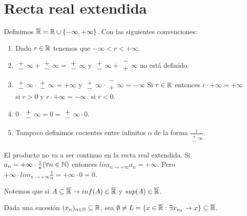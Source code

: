 \section{Recta real extendida}

\begin{definition}
    Definimos $\overline{\mathbb{R}} = \mathbb{R} \cup \{ -\infty, +\infty \}$. Con las siguientes convenciones:
    \begin{enumerate}
        \item Dado $r \in \mathbb{R}$ tenemos que $-\infty < r < +\infty$.
        \item $\substack{+ \\ -} \infty + \substack{+ \\ -} \infty = \substack{+ \\ -} \infty$ y
        $\substack{+ \\ -} \infty + \substack{- \\ +} \infty$ no está definido. 
        \item $\substack{+ \\ -} \infty \cdot \substack{+ \\ -} \infty = +\infty$ y
        $\substack{+ \\ -} \infty \cdot \substack{- \\ +} \infty = -\infty$
        Si $r \in \mathbb{R}$ entonces $r \cdot +\infty = +\infty$ si $r > 0$ y $r \cdot +\infty = -\infty$. si $r < 0$.
        \item $0 \cdot \substack{+ \\ -} \infty = 0 = \substack{+ \\ -} \infty \cdot 0$.
        \item Tampoco definimos cocientes entre infinitos o de la forma $\frac{r}{\substack{+ \\ -} \infty}$.
    \end{enumerate}
\end{definition}

\begin{note}
    El producto no va a ser continuo en la recta real extendida.
    Si $a_n = +\infty \cdot \frac{1}{n} (\forall n \in \mathbb{N})$ entonces $lim_{n \to +\infty} a_n = +\infty$. Pero $+\infty \cdot lim_{n \to +\infty} \frac{1}{n} = +\infty \cdot 0 = 0$. 
\end{note}

Notemos que si $A \subseteq \overline{\mathbb{R}} \to inf(A) \in \overline{\mathbb{R}}$ y $sup(A) \in \overline{\mathbb{R}}$.

Dada una sucesión $(x_n)_{n \in \mathbb{N}} \subseteq \mathbb{R}$, sea $\emptyset \neq L = \{ x \in \overline{\mathbb{R}} : \exists x_{n_k} \to x \} \subseteq \overline{\mathbb{R}}$.

